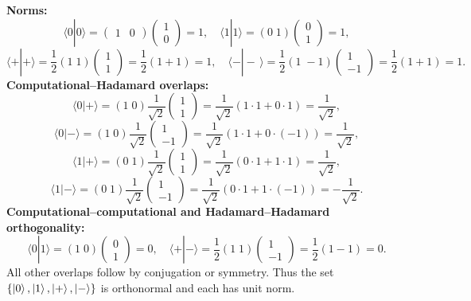 \textbf{Norms:}
\[
\langle0|0\rangle
= \begin{pmatrix}1&0\end{pmatrix}\begin{pmatrix}1\\0\end{pmatrix}
=1,
\quad
\langle1|1\rangle
=(0\;1)\begin{pmatrix}0\\1\end{pmatrix}
=1,
\]
\[
\langle+|+\rangle
=\frac1{2}(1\;1)\begin{pmatrix}1\\1\end{pmatrix}
=\frac1{2}(1+1)=1,
\quad
\langle-|-\,\rangle
=\frac1{2}(1\;-1)\begin{pmatrix}1\\-1\end{pmatrix}
=\frac1{2}(1+1)=1.
\]
\newpage\noindent
\textbf{Computational–Hadamard overlaps:}
\[
\langle0|+\rangle
=(1\;0)\frac1{\sqrt2}\begin{pmatrix}1\\1\end{pmatrix}
=\frac1{\sqrt2}(1\cdot1+0\cdot1)
=\frac1{\sqrt2},
\]
\[
\langle0|-\rangle
=(1\;0)\frac1{\sqrt2}\begin{pmatrix}1\\-1\end{pmatrix}
=\frac1{\sqrt2}(1\cdot1+0\cdot(-1))
=\frac1{\sqrt2},
\]
\[
\langle1|+\rangle
=(0\;1)\frac1{\sqrt2}\begin{pmatrix}1\\1\end{pmatrix}
=\frac1{\sqrt2}(0\cdot1+1\cdot1)
=\frac1{\sqrt2},
\]
\[
\langle1|-\rangle
=(0\;1)\frac1{\sqrt2}\begin{pmatrix}1\\-1\end{pmatrix}
=\frac1{\sqrt2}(0\cdot1+1\cdot(-1))
=-\frac1{\sqrt2}.
\]
\textbf{Computational–computational and Hadamard–Hadamard orthogonality:}
\[
\langle0|1\rangle
=(1\;0)\begin{pmatrix}0\\1\end{pmatrix}
=0,
\quad
\langle+|-\rangle
=\frac1{2}(1\;1)\begin{pmatrix}1\\-1\end{pmatrix}
=\frac1{2}(1-1)=0.
\]
All other overlaps follow by conjugation or symmetry.  Thus the set 
\(\{\ket0,\ket1,\ket+,\ket-\}\) 
is orthonormal and each has unit norm. 


